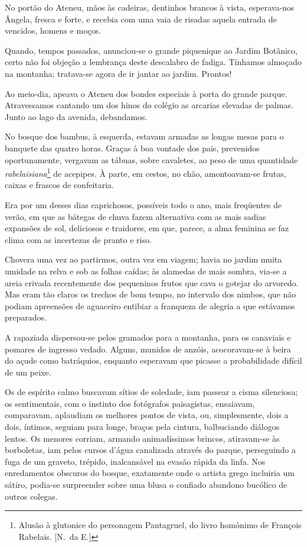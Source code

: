 No portão do Ateneu, mãos às
cadeiras, dentinhos brancos à vista, esperava{}-nos Ângela, fresca e
forte, e recebia com uma vaia de risadas aquela entrada de vencidos,
homens e moços. 

Quando, tempos passados, anunciou{}-se o grande
piquenique ao Jardim Botânico, certo não foi objeção a lembrança deste
descalabro de fadiga. Tínhamos almoçado na montanha; tratava{}-se agora
de ir jantar ao jardim. Prontos! 

Ao meio{}-dia, apeava o Ateneu dos
bondes especiais à porta do grande parque. Atravessamos cantando um dos
hinos do colégio as arcarias elevadas de palmas. Junto ao lago da
avenida, debandamos. 

No bosque dos bambus, à esquerda, estavam armadas
as longas mesas para o banquete das quatro horas. Graças à boa vontade
dos pais, prevenidos oportunamente, vergavam as tábuas, sobre
cavaletes, ao peso de uma quantidade \textit{rabelaisiana}\footnote{ Alusão à 
glutonice do personagem Pantagruel, do livro 
homônimo de François Rabelais. [N.~da E.]} de acepipes. À parte,
em cestos, no chão, amontoavam{}-se frutas, caixas e frascos de confeitaria. 

Era por um desses dias caprichosos, possíveis todo o ano,
mais freqüentes de verão, em que as bátegas de chuva fazem alternativa
com as mais sadias expansões de sol, deliciosos e traidores, em que,
parece, a alma feminina se faz clima com as incertezas de pranto e riso. 

Chovera uma vez ao partirmos, outra vez em viagem; havia no
jardim muita umidade na relva e sob as folhas caídas; às alamedas de
mais sombra, via{}-se a areia crivada recentemente dos pequeninos
frutos que cava o gotejar do arvoredo. Mas eram tão claros os trechos
de bom tempo, no intervalo dos nimbos, que não podiam apreensões de
aguaceiro entibiar a franqueza de alegria a que estávamos preparados. 

A rapaziada dispersou{}-se pelos gramados para a montanha, para os
canaviais e pomares de ingresso vedado. Alguns, munidos de anzóis,
acocoravam{}-se à beira do açude como batráquios, enquanto esperavam
que picasse a probabilidade difícil de um peixe. 

Os de espírito calmo
buscavam sítios de soledade, iam passear a cisma silenciosa; os
sentimentais, com o instinto dos fotógrafos paisagistas, ensaiavam,
comparavam, aplaudiam os melhores pontos de vista, ou, simplesmente,
dois a dois, íntimos, seguiam para longe, braços pela cintura,
balbuciando diálogos lentos. Os menores corriam, armando animadíssimos
brincos, atiravam{}-se às borboletas, iam pelos cursos d'água
canalizada através do parque, perseguindo a fuga de um graveto,
trépido, inalcansável na evasão rápida da linfa. Nos enredamentos
obscuros do bosque, exatamente onde o artista grego incluiria um
sátiro, podia{}-se surpreender sobre uma blusa o confiado abandono
bucólico de outros colegas. 

